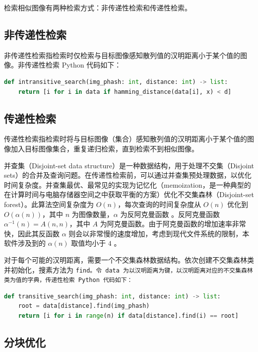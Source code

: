 检索相似图像有两种检索方式：非传递性检索和传递性检索。

\subsection{非传递性检索}

非传递性检索指检索时仅检索与目标图像感知散列值的汉明距离小于某个值的图像。非传递性检索 Python 代码如下：

\begin{lstlisting}[language=Python]
def intransitive_search(img_phash: int, distance: int) -> list:
    return [i for i in data if hamming_distance(data[i], x) < d]
\end{lstlisting}

\subsection{传递性检索}

传递性检索指检索时将与目标图像（集合）感知散列值的汉明距离小于某个值的图像加入目标图像集合，重复递归检索，直到检索不到相似图像。

并查集（Disjoint-set data structure）是一种数据结构，用于处理不交集（Disjoint sets）的合并及查询问题。在传递性检索前，可以通过并查集预处理数据，以优化时间复杂度。并查集最优、最常见的实现为记忆化（memoization，是一种典型的在计算时间与电脑存储器空间之中获取平衡的方案）优化不交集森林（Disjoint-set forest）。此算法空间复杂度为 $O(n)$，每次查询的时间复杂度从 $O(n)$ 优化到 $O(\alpha(n))$，其中 $n$ 为图像数量，$\alpha$ 为反阿克曼函数 \cite{dsf}。反阿克曼函数 $\alpha^{-1}(n) = A(n, n)$，其中 $A$ 为阿克曼函数。由于阿克曼函数的增加速率非常快，因此其反函数 $\alpha$ 则会以非常慢的速度增加，考虑到现代文件系统的限制，本软件涉及到的 $\alpha(n)$ 取值均小于 $4$ \cite{a_1} \cite{a_2} \cite{a_3}。

对于每个可能的汉明距离，需要一个不交集森林数据结构。依次创建不交集森林类并初始化，搜素方法为 \tt{find}。令 \tt{data} 为以汉明距离为键，以汉明距离对应的不交集森林类为值的字典，传递性检索 Python 代码如下：

\begin{lstlisting}[language=Python]
def transitive_search(img_phash: int, distance: int) -> list:
    root = data[distance].find(img_phash)
    return [i for i in range(n) if data[distance].find(i) == root]
\end{lstlisting}

\subsection{分块优化}

